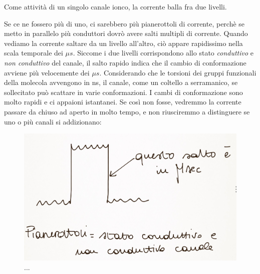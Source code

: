 \documentclass[a4paper,12pt]{article}
\begin{document}
Come attività di un singolo canale ionco, la corrente balla fra due livelli. 

Se ce ne fossero più di uno, ci sarebbero più pianerottoli di corrente, perchè se metto in parallelo più conduttori dovrò avere salti multipli di corrente. Quando vediamo la corrente saltare da un livello all'altro, ciò appare rapidissimo nella scala temporale dei $\mu s$. Siccome i due livelli corrispondono allo stato \emph{conduttivo} e \emph{non conduttivo} del canale, il salto rapido indica che il cambio di conformazione avviene più velocemente dei $\mu s$. Considerando che le torsioni dei gruppi funzionali della molecola avvengono in ns, il canale, come un coltello a serramanico, se sollecitato può scattare in varie conformazioni. I cambi di conformazione sono molto rapidi e ci appaioni istantanei. Se così non fosse, vedremmo la corrente passare da chiuso ad aperto in molto tempo, e non riusciremmo a distinguere se uno o più canali si addizionano:
\begin{figure}[H]
\centering
\includegraphics[scale=0.1]{immagine/2.jpg}
\caption{...}
\end{figure}
\end{document}
